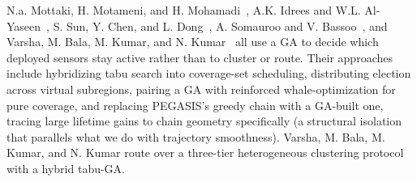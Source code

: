 \documentclass[runningheads]{llncs}
\begin{document}
N.a. Mottaki, H. Motameni,
and H. Mohamadi~\cite{mottaki2023hybridga}, A.K. Idrees and W.L.
Al-Yaseen~\cite{idrees2021digalco}, S. Sun, Y. Chen, and L.
Dong~\cite{sun2024garwoa}, A. Somauroo and V.
Bassoo~\cite{somauroo2019pegga}, and Varsha, M. Bala, M. Kumar, and N.
Kumar~\cite{varsha2019tabuga} all use a GA to decide which deployed sensors
stay active rather than to cluster or route. Their approaches include
hybridizing tabu search into coverage-set scheduling, distributing election
across virtual subregions, pairing a GA with reinforced whale-optimization
for pure coverage, and replacing PEGASIS's greedy chain with a GA-built
one, tracing large lifetime gains to chain geometry specifically (a
structural isolation that parallels what we do with trajectory smoothness).
Varsha, M. Bala, M. Kumar, and N. Kumar route over a three-tier
heterogeneous clustering protocol with a hybrid tabu-GA. 
\end{document}
